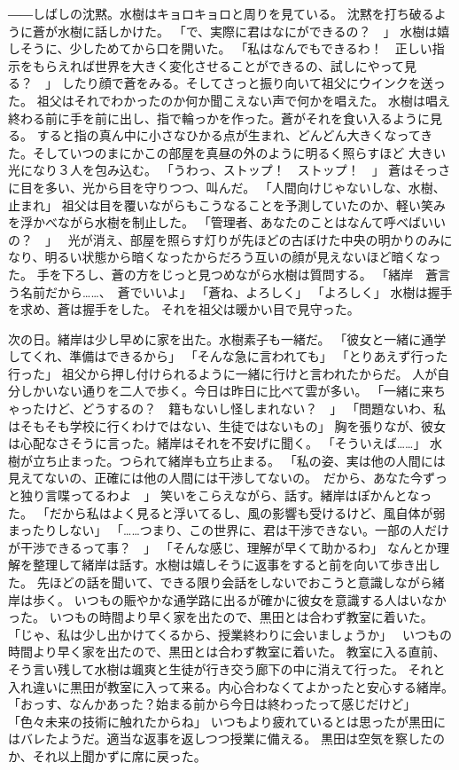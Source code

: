 \documentclass[uplatex]{utbook}
\begin{document}
――しばしの沈黙。水樹はキョロキョロと周りを見ている。
沈黙を打ち破るように蒼が水樹に話しかけた。
「で、実際に君はなにができるの？　」
水樹は嬉しそうに、少しためてから口を開いた。
「私はなんでもできるわ！　正しい指示をもらえれば世界を大きく変化させることができるの、試しにやって見る？　」
したり顔で蒼をみる。そしてさっと振り向いて祖父にウインクを送った。
祖父はそれでわかったのか何か聞こえない声で何かを唱えた。
水樹は唱え終わる前に手を前に出し、指で輪っかを作った。蒼がそれを食い入るように見る。
すると指の真ん中に小さなひかる点が生まれ、どんどん大きくなってきた。そしていつのまにかこの部屋を真昼の外のように明るく照らすほど
大きい光になり３人を包み込む。
「うわっ、ストップ！　ストップ！　」
蒼はそっさに目を多い、光から目を守りつつ、叫んだ。
「人間向けじゃないしな、水樹、止まれ」
祖父は目を覆いながらもこうなることを予測していたのか、軽い笑みを浮かべながら水樹を制止した。
「管理者、あなたのことはなんて呼べばいいの？　」　
光が消え、部屋を照らす灯りが先ほどの古ぼけた中央の明かりのみになり、明るい状態から暗くなったからだろう互いの顔が見えないほど暗くなった。
手を下ろし、蒼の方をじっと見つめながら水樹は質問する。
「緒岸　蒼言う名前だから……、　蒼でいいよ」
「蒼ね、よろしく」
「よろしく」
水樹は握手を求め、蒼は握手をした。
それを祖父は暖かい目で見守った。


次の日。緒岸は少し早めに家を出た。水樹素子も一緒だ。
「彼女と一緒に通学してくれ、準備はできるから」
「そんな急に言われても」
「とりあえず行った行った」
祖父から押し付けられるように一緒に行けと言われたからだ。
人が自分しかいない通りを二人で歩く。今日は昨日に比べて雲が多い。
「一緒に来ちゃったけど、どうするの？　籍もないし怪しまれない？　」
「問題ないわ、私はそもそも学校に行くわけではない、生徒ではないもの」
胸を張りなが、彼女は心配なさそうに言った。緒岸はそれを不安げに聞く。
「そういえば……」
水樹が立ち止まった。つられて緒岸も立ち止まる。
「私の姿、実は他の人間には見えてないの、正確には他の人間には干渉してないの。　だから、あなた今ずっと独り言喋ってるわよ　」
笑いをこらえながら、話す。緒岸はぽかんとなった。
「だから私はよく見ると浮いてるし、風の影響も受けるけど、風自体が弱まったりしない」
「……つまり、この世界に、君は干渉できない。一部の人だけが干渉できるって事？　」
「そんな感じ、理解が早くて助かるわ」
なんとか理解を整理して緒岸は話す。水樹は嬉しそうに返事をすると前を向いて歩き出した。
先ほどの話を聞いて、できる限り会話をしないでおこうと意識しながら緒岸は歩く。
いつもの賑やかな通学路に出るが確かに彼女を意識する人はいなかった。
いつもの時間より早く家を出たので、黒田とは合わず教室に着いた。
「じゃ、私は少し出かけてくるから、授業終わりに会いましょうか」　
いつもの時間より早く家を出たので、黒田とは合わず教室に着いた。
教室に入る直前、そう言い残して水樹は颯爽と生徒が行き交う廊下の中に消えて行った。
それと入れ違いに黒田が教室に入って来る。内心合わなくてよかったと安心する緒岸。
「おっす、なんかあった？始まる前から今日は終わったって感じだけど」
「色々未来の技術に触れたからね」
いつもより疲れているとは思ったが黒田にはバレたようだ。適当な返事を返しつつ授業に備える。
黒田は空気を察したのか、それ以上聞かずに席に戻った。
\end{document}
